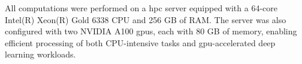 \documentclass[pdflatex,sn-nature, lineno]{sn-jnl}%
\begin{document}
All computations were performed on a \gls{hpc} server equipped with a 64-core Intel(R) Xeon(R) Gold 6338 CPU and 256 GB of RAM. The server was also configured with two NVIDIA A100 \glspl{gpu}, each with 80 GB of memory, enabling efficient processing of both CPU-intensive tasks and \gls{gpu}-accelerated deep learning workloads.





\end{document}
